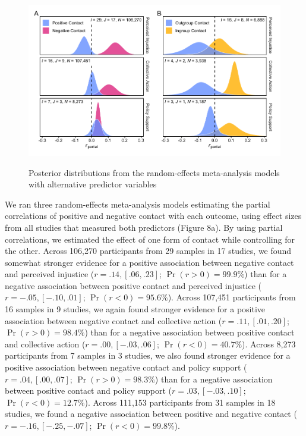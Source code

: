 \documentclass[12pt, letterpaper]{article}
\begin{document}
\begin{figure}[t!]
\centering
\caption{Posterior distributions from the random-effects meta-analysis models with alternative predictor variables}
\includegraphics[scale=1]{../figures/figure-8}
\label{fig:f8}
\end{figure}

We ran three random-effects meta-analysis models estimating the partial
correlations of positive and negative contact with each outcome, using
effect sizes from all studies that measured both predictors (Figure 8a).
By using partial correlations, we estimated the effect of one form of
contact while controlling for the other. Across 106,270 participants
from 29 samples in 17 studies, we found somewhat stronger evidence for a
positive association between negative contact and perceived injustice
(\(r = .14, [.06, .23]\); \(\Pr (r > 0) = 99.9\%\)) than for a negative
association between positive contact and perceived injustice
(\(r = -.05, [-.10, .01]\); \(\Pr (r < 0) = 95.6\%\)). Across 107,451
participants from 16 samples in 9 studies, we again found stronger
evidence for a positive association between negative contact and
collective action (\(r = .11, [.01, .20]\); \(\Pr (r > 0) = 98.4\%\))
than for a negative association between positive contact and collective
action (\(r = .00, [-.03, .06]\); \(\Pr (r < 0) = 40.7\%\)). Across
8,273 participants from 7 samples in 3 studies, we also found stronger
evidence for a positive association between negative contact and policy
support (\(r = .04, [.00, .07]\); \(\Pr (r > 0) = 98.3\%\)) than for a
negative association between positive contact and policy support
(\(r = .03, [-.03, .10]\); \(\Pr (r < 0) = 12.7\%\)). Across 111,153
participants from 31 samples in 18 studies, we found a negative
association between positive and negative contact
(\(r = -.16, [-.25, -.07]\); \(\Pr (r < 0) = 99.8\%\)).
\end{document}
